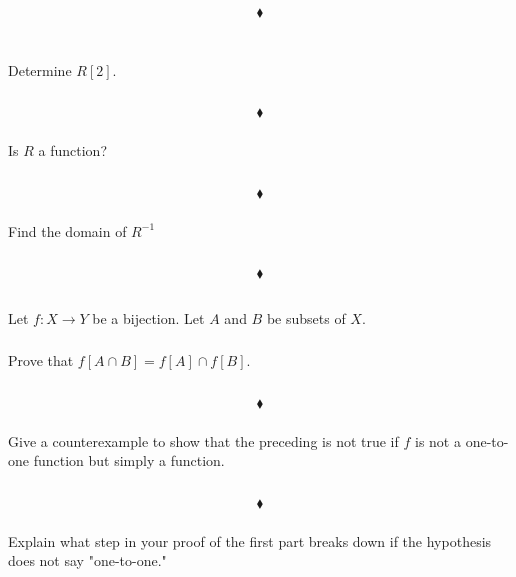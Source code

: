 $$\blacklozenge$$\\
\subsubsection{}
\begin{tcolorbox}
Determine $R[2]$. 
\end{tcolorbox}
$$ $$
 
$$\blacklozenge$$
\subsubsection{}
\begin{tcolorbox}
Is $R$ a function? 
\end{tcolorbox}
$$ $$
 
$$\blacklozenge$$
\subsubsection{}
\begin{tcolorbox}
Find the domain of $R^{-1}$
\end{tcolorbox}
$$ $$
 
$$\blacklozenge$$


\renewcommand{\thesubsection}{\thesection.\RomanNumeralCaps{5}}
\subsection{}
Let $f: X\rightarrow Y$ be a bijection. Let $A$ and $B$ be subsets of $X$.

\subsubsection{}
\begin{tcolorbox}
Prove that $f[A \cap B] = f[A] \cap  f[B]$.
\end{tcolorbox}
$$ $$

$$\blacklozenge$$

\subsubsection{}
\begin{tcolorbox}
Give a counterexample to show that the preceding is not true if $f$ is not a one-to-one function but simply a function. 
\end{tcolorbox}
$$ $$

$$\blacklozenge$$

\subsubsection{}
\begin{tcolorbox}
Explain what step in your proof of the first part breaks down if the hypothesis does not say "one-to-one." 
\end{tcolorbox}
$$ $$


